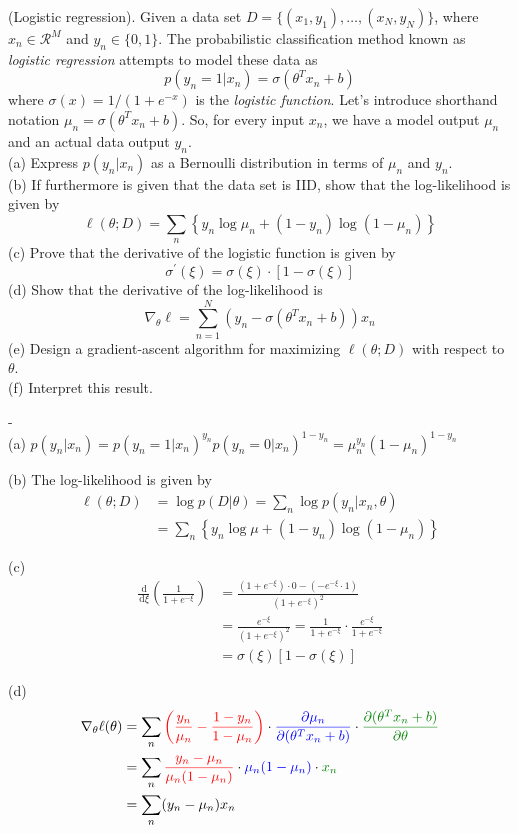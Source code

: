 \documentclass[a4paper]{article}
\def\r#1{{\color{red}#1}}
\def\b#1{{\color{blue}#1}}
\def\g#1{{\color{mygreen}#1}}
\def\d#1{{\,\mathrm{d}#1}}
\begin{document}
\begin{ExerciseList}
\Exercise[label={ex:logistic-regression}] (Logistic regression). Given a data set $D=\{(x_1,y_1),\ldots,(x_N,y_N)\}$, where $x_n \in \mathcal{R}^M$ and $y_n \in \{0,1\}$. The probabilistic classification method known as \emph{logistic regression} attempts to model these data as
$$p(y_n=1|x_n) = \sigma(\theta^T x_n + b)$$
where $\sigma(x) = 1/(1+e^{-x})$ is the \emph{logistic function}. Let's introduce shorthand notation $\mu_n=\sigma(\theta^T x_n + b)$. So, for every input $x_n$, we have a model output $\mu_n$ and an actual data output $y_n$.\\

(a) Express $p(y_n|x_n)$ as a Bernoulli distribution in terms of $\mu_n$ and $y_n$.\\
(b) If furthermore is given that the data set is IID, show that the log-likelihood is given by
$$
\ell(\theta;D) = \sum_n \left\{y_n \log \mu_n  + (1-y_n)\log(1-\mu_n)\right\}
$$
(c) Prove that the derivative of the logistic function is given by
$$
\sigma^\prime(\xi) = \sigma(\xi)\cdot\left[1-\sigma(\xi)\right]
$$
(d) Show that the derivative of the log-likelihood is
$$
\nabla_\theta \ell = \sum_{n=1}^N \left( y_n - \sigma(\theta^T x_n +b)\right)x_n
$$
(e) Design a gradient-ascent algorithm for maximizing $\ell(\theta;D)$ with respect to $\theta$.\\
(f) Interpret this result.

\Answer[ref={ex:logistic-regression}]-\\

(a) $p(y_n|x_n) = p(y_n=1|x_n)^{y_n} p(y_n=0|x_n)^{1-y_n} = \mu_n^{y_n}(1-\mu_n)^{1-y_n}$

(b) The log-likelihood is given by
\begin{align*} \ell(\theta;D) &= \log p(D|\theta) = \sum_n \log p(y_n|x_n,\theta)\\
&= \sum_n \left\{y_n \log \mu + (1-y_n)\log(1-\mu_n)\right\}
\end{align*}

(c) \begin{align*}
\frac{\d{}}{\d{\xi}}\left( \frac{1}{1+e^{-\xi}}\right) &= \frac{(1+e^{-\xi})\cdot 0 - (-e^{-\xi}\cdot 1)}{(1+e^{-\xi})^2}\\
&= \frac{e^{-\xi}}{(1+e^{-\xi})^2} = \frac{1}{1+e^{-\xi}}\cdot \frac{e^{-\xi}}{1+e^{-\xi}}\\
&=\sigma(\xi)\left[ 1-\sigma(\xi)\right]
\end{align*}

(d)
\begin{align*}
\nabla_\theta \ell(\theta) &= \sum_n \r{\left(\frac{y_n}{\mu_n} - \frac{1-y_n}{1-\mu_n} \right)} \cdot \b{\frac{\partial{\mu_n}}{\partial{(\theta^T x_n +b)}}} \cdot \g{\frac{\partial{(\theta^T x_n +b)}}{\partial{\theta}}}\\
&= \sum_n \r{\frac{y_n - \mu_n}{\mu_n(1-\mu_n)}} \cdot \b{\mu_n(1-\mu_n)} \cdot \g{x_n}\\
&= \sum_n (y_n - \mu_n)x_n
\end{align*}


\end{ExerciseList}
\end{document}
